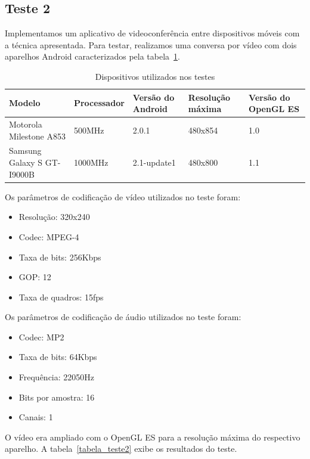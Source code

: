 \documentclass{acm_proc_article-sp}
\begin{document}
\subsection{Teste 2}
Implementamos um aplicativo de videoconferência entre dispositivos móveis com a técnica apresentada. Para testar, realizamos uma conversa por vídeo com dois aparelhos Android caracterizados pela tabela~\ref{tabela_dispositivos}.
\begin{table}
\centering
\caption{Dispositivos utilizados nos testes}
\label{tabela_dispositivos}
\begin{tabular}{|p{1.5cm}|p{1.5cm}|p{1cm}|p{1.5cm}|p{1cm}|} \hline
Modelo&Processador&Versão do Android&Resolução máxima&Versão do OpenGL ES\\ \hline
Motorola Milestone A853&500MHz&2.0.1&480x854&1.0\\ \hline
Samsung Galaxy S GT-I9000B&1000MHz&2.1-update1&480x800&1.1\\
\hline\end{tabular}
\end{table}

Os parâmetros de codificação de vídeo utilizados no teste foram:
\begin{itemize}
 \item Resolução: 320x240
 \item Codec: MPEG-4
 \item Taxa de bits: 256Kbps
 \item GOP: 12
 \item Taxa de quadros: 15fps
\end{itemize}
Os parâmetros de codificação de áudio utilizados no teste foram:
\begin{itemize}
 \item Codec: MP2
 \item Taxa de bits: 64Kbps
 \item Frequência: 22050Hz
 \item Bits por amostra: 16
 \item Canais: 1
\end{itemize}

O vídeo era ampliado com o OpenGL ES para a resolução máxima do respectivo aparelho. A tabela~\ref{tabela_teste2} exibe os resultados do teste.
\end{document}
